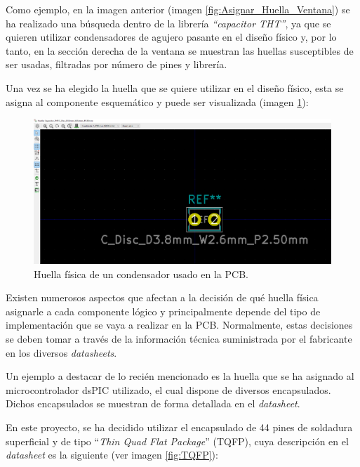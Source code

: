 Como ejemplo, en la imagen anterior (imagen \ref{fig:Asignar_Huella_Ventana}) se ha realizado una búsqueda dentro de la librería \textit{``capacitor \ac{THT}''}, ya que se quieren utilizar condensadores de agujero pasante en el diseño físico y, por lo tanto, en la sección derecha de la ventana se muestran las huellas susceptibles de ser usadas, filtradas por número de pines y librería.

Una vez se ha elegido la huella que se quiere utilizar en el diseño físico, esta se asigna al componente esquemático y puede ser visualizada (imagen \ref{fig:Huella_Condensador}):


\begin{figure}[H]
\centering 
\includegraphics[width=\linewidth]{pictures/huellaCondensador.PNG}
\caption{Huella física  de un condensador usado en la \ac{PCB}.}
\label{fig:Huella_Condensador}
\end{figure}

Existen numerosos aspectos que afectan a la decisión de qué huella física asignarle a cada componente lógico y principalmente depende del tipo de implementación que se vaya a realizar en la \ac{PCB}. Normalmente, estas decisiones se deben tomar a través de la información técnica suministrada por el fabricante en los diversos \textit{datasheets}.

Un ejemplo a destacar de lo recién mencionado es la huella que se ha asignado al microcontrolador dsPIC utilizado, el cual dispone de diversos encapsulados. Dichos encapsulados se muestran de forma detallada en el \textit{datasheet}.

En este proyecto, se ha decidido utilizar el encapsulado de 44 pines de soldadura superficial y de tipo ``\textit{Thin Quad Flat Package}'' (TQFP), cuya descripción en el \textit{datasheet} es la siguiente (ver imagen \ref{fig:TQFP}):

